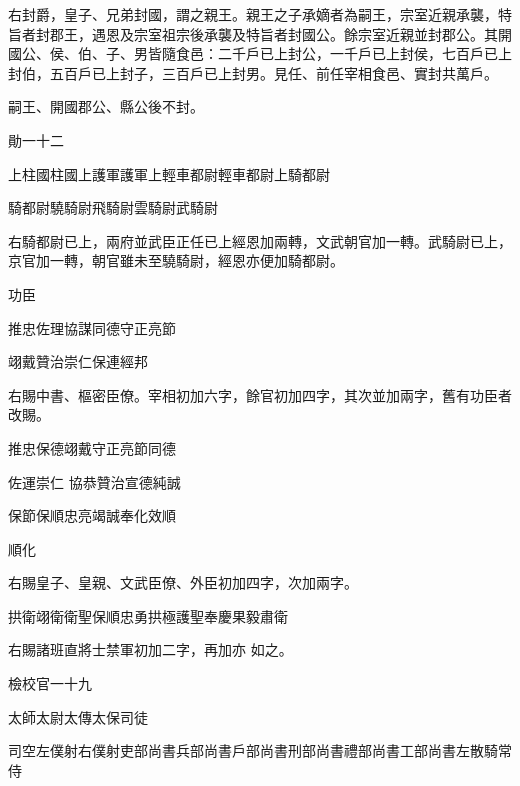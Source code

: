 \begin{pinyinscope}
 右封爵，皇子、兄弟封國，謂之親王。親王之子承嫡者為嗣王，宗室近親承襲，特旨者封郡王，遇恩及宗室祖宗後承襲及特旨者封國公。餘宗室近親並封郡公。其開國公、侯、伯、子、男皆隨食邑：二千戶已上封公，一千戶已上封侯，七百戶已上封伯，五百戶已上封子，三百戶已上封男。見任、前任宰相食邑、實封共萬戶。



 嗣王、開國郡公、縣公後不封。



 勛一十二



 上柱國柱國上護軍護軍上輕車都尉輕車都尉上騎都尉



 騎都尉驍騎尉飛騎尉雲騎尉武騎尉



 右騎都尉已上，兩府並武臣正任已上經恩加兩轉，文武朝官加一轉。武騎尉已上，京官加一轉，朝官雖未至驍騎尉，經恩亦便加騎都尉。



 功臣



 推忠佐理協謀同德守正亮節



 翊戴贊治崇仁保連經邦



 右賜中書、樞密臣僚。宰相初加六字，餘官初加四字，其次並加兩字，舊有功臣者改賜。



 推忠保德翊戴守正亮節同德



 佐運崇仁
 協恭贊治宣德純誠



 保節保順忠亮竭誠奉化效順



 順化



 右賜皇子、皇親、文武臣僚、外臣初加四字，次加兩字。



 拱衛翊衛衛聖保順忠勇拱極護聖奉慶果毅肅衛



 右賜諸班直將士禁軍初加二字，再加亦
 如之。



 檢校官一十九



 太師太尉太傳太保司徒



 司空左僕射右僕射吏部尚書兵部尚書戶部尚書刑部尚書禮部尚書工部尚書左散騎常侍




\end{pinyinscope}
